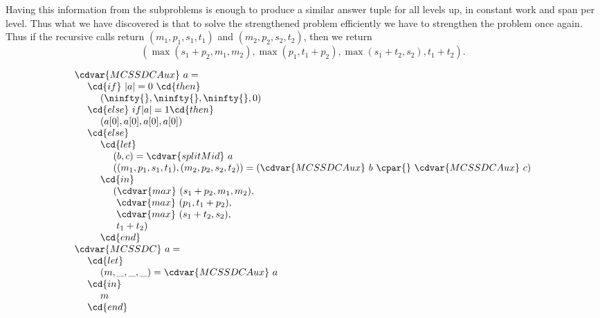 \begin{gram}
Having this information from the subproblems is enough to produce a
similar answer tuple for all levels up, in constant work and span per
level. Thus what we have discovered is that to solve the strengthened
problem efficiently we have to strengthen the problem once again.
Thus if the recursive calls return $(m_1, p_1, s_1, t_1)$ and $(m_2,
p_2, s_2, t_2)$, then we return
\[
  (\max(s_1+p_2, m_1, m_2), \max(p_1,
  t_1+p_2), \max(s_1+t_2, s_2), t_1+t_2).
\]
%
\end{gram}


%
\begin{algorithm}
\[
\begin{array}{l}
\cdvar{MCSSDCAux}~a = 
\\
~~~~\cd{if}~|a| = 0~\cd{then}
\\
~~~~~~~~(\ninfty{},\ninfty{},\ninfty{},0)
\\
~~~~\cd{else}~if |a| = 1 \cd{then}
\\
~~~~~~~~(a[0], a[0], a[0], a[0])
\\
~~~~\cd{else}
\\
~~~~~~~~\cd{let} 
\\
~~~~~~~~~~~~(b,c) = \cdvar{splitMid}~a 
\\
~~~~~~~~~~~~((m_1, p_1, s_1, t_1), (m_2, p_2, s_2, t_2)) = (\cdvar{MCSSDCAux}~b~\cpar{}~\cdvar{MCSSDCAux}~c)
\\
~~~~~~~~\cd{in} 
\\
~~~~~~~~~~~~(\cdvar{max}~(s_1+p_2, m_1, m_2),   
\\
~~~~~~~~~~~~~\cdvar{max}~(p_1, t_1+p_2),      
\\
~~~~~~~~~~~~~\cdvar{max}~(s_1+t_2, s_2),     
\\
~~~~~~~~~~~~~t_1+t_2)              
\\
~~~~~~~~\cd{end}
\\
\cdvar{MCSSDC}~a = 
\\
~~~~\cd{let} 
\\
~~~~~~~~(m, \_, \_, \_) = \cdvar{MCSSDCAux}~a 
\\
~~~~\cd{in}
\\
~~~~~~~~m 
\\
~~~~\cd{end}
\end{array}
\]
\end{algorithm}




